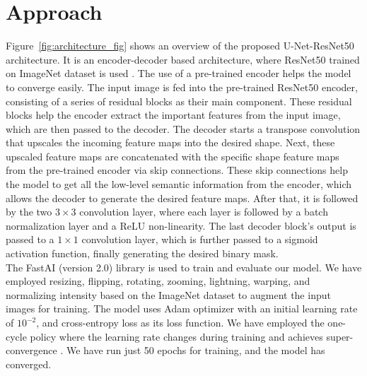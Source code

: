 \documentclass[sigconf]{acmart-me}
\begin{document}
\section{Approach}
\label{sec:approach}
Figure~\ref{fig:architecture_fig} shows an overview of the proposed U-Net-ResNet50 architecture. It is an encoder-decoder based architecture, where ResNet50 trained on ImageNet dataset \cite{russakovsky2015imagenet} is used . The use of a pre-trained encoder helps the model to converge easily.
The input image is fed into the pre-trained ResNet50 encoder, consisting of a series of residual blocks as their main component. These residual blocks help the encoder extract the important features from the input image, which are then passed to the decoder. The decoder starts a transpose convolution that upscales the incoming feature maps into the desired shape. Next, these upscaled feature maps are concatenated with the specific shape feature maps from the pre-trained encoder via skip connections. These skip connections help the model to get all the low-level semantic information from the encoder, which allows the decoder to generate the desired feature maps. After that, it is followed by the two $3 \times 3$ convolution layer, where each layer is followed by a batch normalization layer and a ReLU non-linearity. The last decoder block's output is passed to a $1 \times 1$ convolution layer, which is further passed to a sigmoid activation function, finally generating the desired binary mask.\\
\indent The FastAI (version 2.0) library \cite{docsfast} is used to train and evaluate our model. We have employed resizing, flipping, rotating, zooming, lightning, warping, and normalizing intensity based on the ImageNet dataset to augment the input images for training. The model uses Adam optimizer with an initial learning rate of $10^{-2}$, and cross-entropy loss as its loss function. We have employed the one-cycle policy where the learning rate changes during training and achieves super-convergence \cite{smith2019super}. We have run just 50 epochs for training, and the model has converged.
\end{document}
